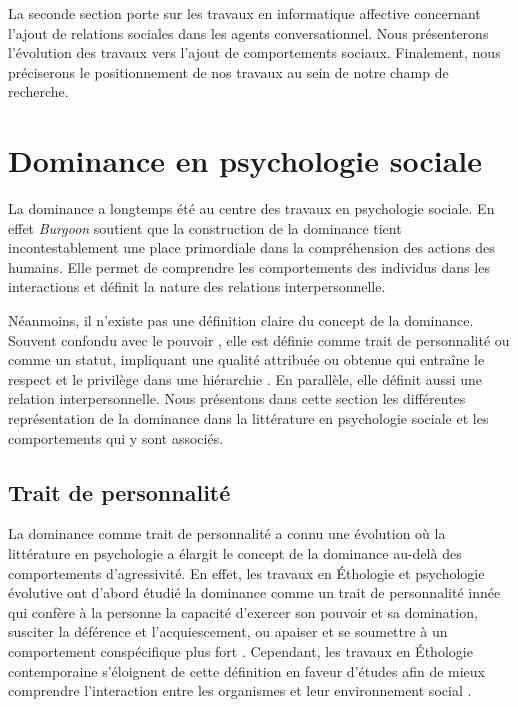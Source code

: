 La seconde section porte sur les travaux en informatique affective concernant l'ajout de relations sociales dans les agents conversationnel. Nous présenterons l'évolution des travaux vers l'ajout de comportements sociaux. Finalement, nous préciserons le positionnement de nos travaux au sein de notre champ de recherche.

\section{Dominance en psychologie sociale}
	La dominance a longtemps été au centre des travaux en psychologie sociale. En effet \emph{Burgoon} soutient que la construction de la dominance tient incontestablement une place primordiale dans la compréhension des actions des humains\cite{burgoon1995interpersonal}. Elle permet de comprendre les comportements des individus dans les interactions et définit la nature des relations interpersonnelle. 
	
	Néanmoins, il n'existe pas une définition claire du concept de la dominance. Souvent confondu avec le pouvoir \cite{burgoon2000interactionist,dunbar2005perceptions}, elle est définie comme trait de personnalité ou comme un statut, impliquant une qualité attribuée ou obtenue qui entraîne le respect et le privilège dans une hiérarchie \cite{hall2005nonverbal}. En parallèle, elle définit aussi une relation interpersonnelle. Nous présentons dans cette section les différentes représentation de la dominance dans la littérature en psychologie sociale et les comportements qui y sont associés.  
	
\subsection{Trait de personnalité}

La dominance comme trait de personnalité a connu une évolution où la littérature en psychologie a élargit le concept de la dominance au-delà des comportements d'agressivité.
En effet, les travaux en Éthologie et psychologie évolutive ont d'abord étudié la dominance comme un trait de personnalité innée qui confère à la personne la capacité d'exercer son pouvoir et sa domination, susciter la déférence et l'acquiescement, ou apaiser et se soumettre à un comportement conspécifique plus fort \cite{keltner1995signs,burgoon2006nonverbal}. Cependant, les travaux en Éthologie contemporaine s'éloignent de cette définition en faveur d'études afin de mieux comprendre l'interaction entre les organismes et leur environnement social \cite{burgoon2006nonverbal}.

